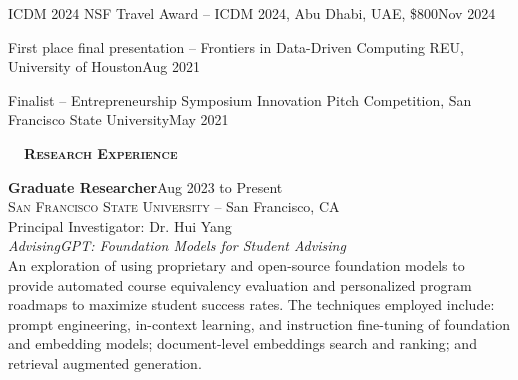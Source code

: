 \documentclass[hidelinks, 10.5pt]{article}
\def\contentwidth{0.9\linewidth}    %
\def\contentblockspacing{2.5mm}     %
\def\contentheaderspacing{1mm}      %
\def\sectionspacing{8mm}            %
\def\sectiontocontentspacing{4mm}   %
\renewcommand{\section}[1]{
    {\fontsize{14}{14}\selectfont \textsc{\textbf{\ \ #1\ \ }}}\hrulefill
}
\begin{document}
{\begin{minipage}[ct]{\contentwidth}
    ICDM 2024 NSF Travel Award -- ICDM 2024, Abu Dhabi, UAE, \$800\hfill Nov 2024
\end{minipage}

\vspace{\contentblockspacing}

\begin{minipage}[ct]{\contentwidth}
    First place final presentation -- Frontiers in Data-Driven Computing REU,
    University of Houston\hfill Aug 2021
\end{minipage}

\vspace{\contentblockspacing}

\begin{minipage}[ct]{\contentwidth}
    Finalist -- Entrepreneurship Symposium Innovation Pitch Competition, San
    Francisco State University\hfill May 2021
\end{minipage}

\vspace{\sectionspacing}


\section{Research Experience}

\vspace{\sectiontocontentspacing}

\begin{minipage}[ct]{\contentwidth}
    \textbf{Graduate Researcher}\hfill Aug 2023 to Present\\
    \textsc{San Francisco State University} -- San Francisco, CA\\
    Principal Investigator: Dr. Hui Yang
    \vspace{\contentheaderspacing}\\
    {\textit{AdvisingGPT: Foundation Models for Student Advising}}\\
    An exploration of using proprietary and open-source foundation models to provide automated course equivalency evaluation and
    personalized program roadmaps to maximize student success rates. The techniques employed include: prompt engineering, in-context
    learning, and instruction fine-tuning of foundation and embedding models; document-level embeddings search and ranking; and
    retrieval augmented generation.
\end{minipage}

}
\end{document}

